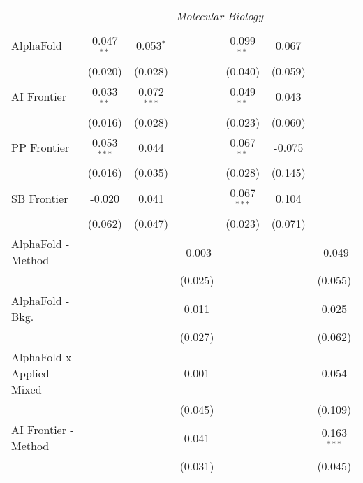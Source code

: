 \begin{tabular}{lcccccc}
 & \multicolumn{6}{c}{\textit{Molecular Biology}} \\ \\
   AlphaFold                     & 0.047$^{**}$  & 0.053$^{*}$   &                & 0.099$^{**}$  & 0.067   &   \\   
                                 & (0.020)       & (0.028)       &                & (0.040)       & (0.059) &   \\   
   AI Frontier                   & 0.033$^{**}$  & 0.072$^{***}$ &                & 0.049$^{**}$  & 0.043   &   \\   
                                 & (0.016)       & (0.028)       &                & (0.023)       & (0.060) &   \\   
   PP Frontier                   & 0.053$^{***}$ & 0.044         &                & 0.067$^{**}$  & -0.075  &   \\   
                                 & (0.016)       & (0.035)       &                & (0.028)       & (0.145) &   \\   
   SB Frontier                   & -0.020        & 0.041         &                & 0.067$^{***}$ & 0.104   &   \\   
                                 & (0.062)       & (0.047)       &                & (0.023)       & (0.071) &   \\   
   AlphaFold - Method            &               &               & -0.003         &               &         & -0.049\\   
                                 &               &               & (0.025)        &               &         & (0.055)\\   
   AlphaFold - Bkg.              &               &               & 0.011          &               &         & 0.025\\   
                                 &               &               & (0.027)        &               &         & (0.062)\\   
   AlphaFold x Applied - Mixed   &               &               & 0.001          &               &         & 0.054\\   
                                 &               &               & (0.045)        &               &         & (0.109)\\   
   AI Frontier - Method          &               &               & 0.041          &               &         & 0.163$^{***}$\\   
                                 &               &               & (0.031)        &               &         & (0.045)\\   

\end{tabular}
